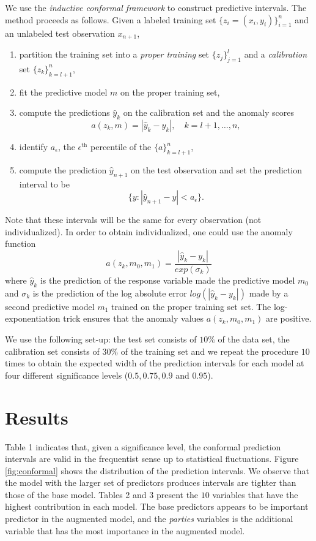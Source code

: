 \documentclass[10pt]{amsart}%
\begin{document}
We use the \textit{inductive conformal framework} \cite{Papadopoulos.2002} to construct predictive intervals. The method proceeds as follows. Given a labeled training set $\{z_i = (x_i, y_i)\}_{i=1}^n$ and an unlabeled test observation $x_{n+1}$,
\begin{enumerate}
	\item partition the training set into a \textit{proper training} set $\{z_j\}_{j=1}^l$ and a \textit{calibration} set $\{z_k \}_{k=l+1}^n$,
	\item fit the predictive model $m$ on the proper training set,
	\item compute the predictions $\hat{y}_k$ on the calibration set and the anomaly scores
	$$a(z_k, m) = |\hat{y}_k - y_k|, \quad k = l+1, \dots, n,$$
	\item identify $a_\epsilon$, the $\epsilon^{\text{th}}$ percentile of the $\{a\}_{k=l+1}^n$,
	\item compute the prediction $\hat{y}_{n+1}$ on the test observation and set the prediction interval to be
	$$\{y: |\hat{y}_{n+1} - y| < a_\epsilon\}.$$
\end{enumerate}
Note that these intervals will be the same for every observation (not individualized). In order to obtain individualized, one could use the anomaly function
$$a(z_k, m_0, m_1) = \dfrac{|\hat{y}_k - y_k|}{exp(\sigma_k)}$$
where $\hat{y}_k$ is the prediction of the response variable made the predictive model $m_0$ and $\sigma_k$ is the prediction of the log absolute error $log(|\hat{y}_k - y_k|)$ made by a second predictive model $m_1$ trained on the proper training set set. The log-exponentiation trick ensures that the anomaly values $a(z_k, m_0, m_1)$ are positive.

We use the following set-up: the test set consists of $10\%$ of the data set, the calibration set consists of $30\%$ of the training set and we repeat the procedure $10$ times to obtain the expected width of the prediction
intervals for each model at four different significance levels ($0.5, 0.75, 0.9$ and $0.95$).


\section{Results}
\label{sec:results}

Table 1 indicates that, given a significance level, the conformal prediction intervals are valid in the frequentist sense up to statistical fluctuations. Figure \ref{fig:conformal} shows the distribution of the prediction intervals. We observe that the model with the larger set of predictors produces intervals are tighter than those of the base model. Tables 2 and 3 present the $10$ variables that have the highest contribution in each model. The base predictors appears to be important predictor in the augmented model, and the \textit{parties} variables is the additional variable that has the most importance in the augmented model. 
\end{document}
